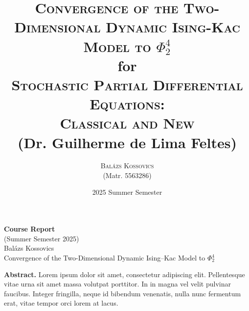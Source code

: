 \documentclass{report}
\title{\textsc{Convergence of the Two-Dimensional Dynamic Ising-Kac Model to $\Phi^4_2$}
\\[1.5em]
{\small {for}}\\[1.5em]
{\Large \textsc{Stochastic Partial Differential Equations: \\Classical and New}}\\
{\large (Dr. Guilherme de Lima Feltes)}}
\author{
    \textsc{Balázs Kossovics}\\
    {\small (Matr. 5563286)}
}
\date{2025 Summer Semester}
\theoremstyle{remark}
\theoremstyle{definition}
\begin{document}
\begin{center}
    \Large{\textbf{Course Report}\\(Summer Semester 2025)}\\[1em]
    \normalsize
    Balázs Kossovics \\[0.25em]
    Convergence of the Two-Dimensional Dynamic Ising–Kac Model to $\Phi^4_2$\\[0.5em]
\end{center}

\vspace{1em}
\noindent\textbf{Abstract.} 
Lorem ipsum dolor sit amet, consectetur adipiscing elit. 
Pellentesque vitae urna sit amet massa volutpat porttitor. 
In in magna vel velit pulvinar faucibus. 
Integer fringilla, neque id bibendum venenatis, nulla nunc fermentum erat, vitae tempor orci lorem at lacus.

\vspace{1.5em}




\tableofcontents
\end{document}
